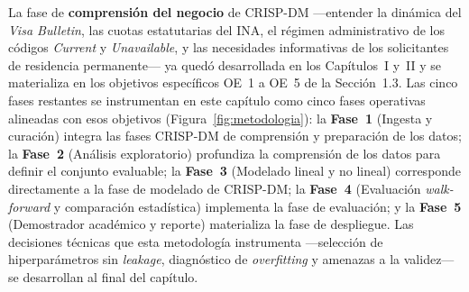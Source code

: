 \documentclass[12pt,letterpaper]{report}
\begin{document}
La fase de \textbf{comprensión del negocio} de CRISP-DM ---entender la dinámica del \textit{Visa Bulletin}, las cuotas estatutarias del INA, el régimen administrativo de los códigos \textit{Current} y \textit{Unavailable}, y las necesidades informativas de los solicitantes de residencia permanente--- ya quedó desarrollada en los Capítulos~I y~II y se materializa en los objetivos específicos OE~1 a OE~5 de la Sección~1.3. Las cinco fases restantes se instrumentan en este capítulo como cinco fases operativas alineadas con esos objetivos (Figura~\ref{fig:metodologia}): la \textbf{Fase~1} (Ingesta y curación) integra las fases CRISP-DM de comprensión y preparación de los datos; la \textbf{Fase~2} (Análisis exploratorio) profundiza la comprensión de los datos para definir el conjunto evaluable; la \textbf{Fase~3} (Modelado lineal y no lineal) corresponde directamente a la fase de modelado de CRISP-DM; la \textbf{Fase~4} (Evaluación \textit{walk-forward} y comparación estadística) implementa la fase de evaluación; y la \textbf{Fase~5} (Demostrador académico y reporte) materializa la fase de despliegue. Las decisiones técnicas que esta metodología instrumenta ---selección de hiperparámetros sin \textit{leakage}, diagnóstico de \textit{overfitting} y amenazas a la validez--- se desarrollan al final del capítulo.
\end{document}
